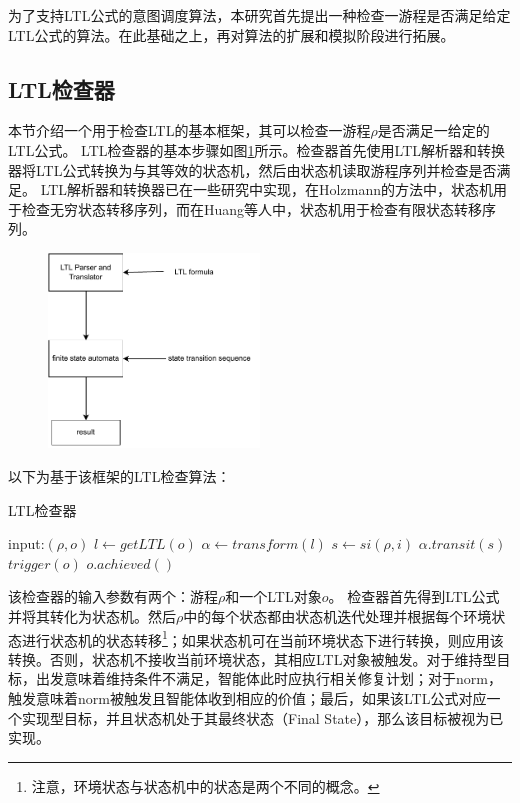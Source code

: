 为了支持LTL公式的意图调度算法，本研究首先提出一种检查一游程是否满足给定LTL公式的算法。在此基础之上，再对\SA 算法的扩展和模拟阶段进行拓展。

\subsection{LTL检查器}
本节介绍一个用于检查LTL的基本框架，其可以检查一游程$\rho$是否满足一给定的LTL公式。
LTL检查器的基本步骤如图\ref{fig:translator}所示。检查器首先使用LTL解析器和转换器将LTL公式转换为与其等效的状态机，然后由状态机读取游程序列并检查是否满足。
LTL解析器和转换器已在一些研究中\cite{DBLP:books/daglib/0020982,DBLP:journals/jlap/HuangC22}实现，在Holzmann\cite{DBLP:books/daglib/0020982}的方法中，状态机用于检查无穷状态转移序列，而在Huang等人\cite{DBLP:journals/jlap/HuangC22}中，状态机用于检查有限状态转移序列。

\begin{figure}[htb]
\centering
\includegraphics[width=0.5\textwidth]{./figs/translator}
\label{fig:translator}
\end{figure}

以下为基于该框架的LTL检查算法：
\begin{algorithm} %
\caption{LTL检查器}\label{checker}
\begin{algorithmic}[1]
\STATE input:$(\rho, o)$
\STATE $l \gets getLTL(o)$
\STATE $\alpha \gets transform(l)$ 
  \STATE $s \gets si(\rho, i)$
    \STATE $\alpha.transit(s)$
    \ELSE
    \STATE $trigger(o)$
  \ENDIF
\ENDFOR
{}
  \STATE $o.achieved()$
\ENDIF
\end{algorithmic}
\end{algorithm}
该检查器的输入参数有两个：游程$\rho$和一个LTL对象$o$。
%
检查器首先得到LTL公式并将其转化为状态机。然后$\rho$中的每个状态都由状态机迭代处理并根据每个环境状态进行状态机的状态转移\footnote{注意，环境状态与状态机中的状态是两个不同的概念。}；如果状态机可在当前环境状态下进行转换，则应用该转换。否则，状态机不接收当前环境状态，其相应LTL对象被触发。对于维持型目标，出发意味着维持条件不满足，智能体此时应执行相关修复计划；对于norm，触发意味着norm被触发且智能体收到相应的价值；最后，如果该LTL公式对应一个实现型目标，并且状态机处于其最终状态（Final State），那么该目标被视为已实现。

